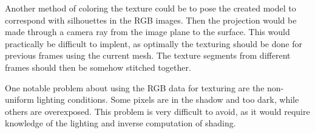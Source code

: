 Another method of coloring the texture could be to pose the created model to correspond with silhouettes in the RGB images. Then the projection would be made through a camera ray from the image plane to the surface. This would practically be difficult to implent, as optimally the texturing should be done for previous frames using the current mesh. The texture segments from different frames should then be somehow stitched together.

One notable problem about using the RGB data for texturing are the non-uniform lighting conditions. Some pixels are in the shadow and too dark, while others are overexposed. This problem is very difficult to avoid, as it would require knowledge of the lighting and inverse computation of shading.
